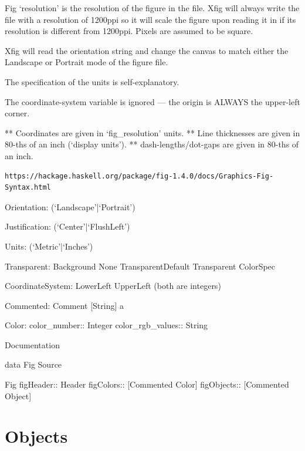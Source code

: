 \documentclass[10pt, a4paper, english]{article}%
\begin{document}
 Fig `resolution' is the resolution of the figure in the file.
    Xfig will always write the file with a resolution of 1200ppi so it
    will scale the figure upon reading it in if its resolution is different
    from 1200ppi.  Pixels are assumed to be square.

    Xfig will read the orientation string and change the canvas to match
    either the Landscape or Portrait mode of the figure file.

    The specification of the units is self-explanatory.

    The coordinate-system variable is ignored --- the origin is ALWAYS the
    upper-left corner.

    ** Coordinates are given in `fig\_resolution' units.
    ** Line thicknesses are given in 80-ths of an inch (`display units').
    ** dash-lengths/dot-gaps are given in 80-ths of an inch.


\begin{Verbatim}[fontsize=\scriptsize]
https://hackage.haskell.org/package/fig-1.4.0/docs/Graphics-Fig-Syntax.html
\end{Verbatim}





Orientation: (`Landscape'|`Portrait')

Justification: (`Center'|`FlushLeft')

Units: (`Metric'|`Inches')





Transparent:
Background	 
None	 
TransparentDefault	 
Transparent ColorSpec	 


CoordinateSystem:
LowerLeft	 
UpperLeft	 
(both are integers)

Commented:
Comment [String] a	 


Color:
color\_number:: Integer
color\_rgb\_values:: String


Documentation

data Fig
Source

Fig	 
figHeader:: Header
figColors:: [Commented Color]
figObjects:: [Commented Object]


\section{Objects}\label{sec:obj}
\end{document}
